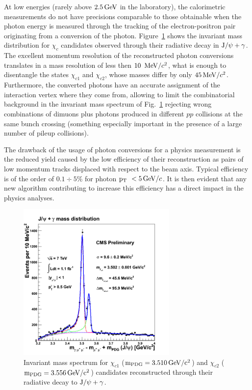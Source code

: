 \documentclass[a4paper]{jpconf}
\def \Chione {\chi_{c1}}
\def \Chitwo {\chi_{c2}}
\def \JPsi{\rm J/\psi}
\def \cPgg{\gamma}
\def \pt{$\p_{\rm T}$~}
\begin{document}
At  low energies (rarely above 
$2.5{\rm \, GeV}$ in the laboratory), the calorimetric
measurements do not have precisions comparable to those obtainable
when the photon energy is measured through the tracking of the 
electron-positron pair originating from a conversion of the photon.
Figure~\ref{fig:chic} shows the invariant mass distribution for $\chi_c$ candidates
observed through their radiative decay in $\JPsi + \cPgg$. The excellent momentum resolution of the reconstructed photon conversions translates in a mass resolution of less then $10~{\rm \, MeV}/c^2$, what is enough to disentangle  the states $\Chione$ and $\Chitwo$, whose masses differ by only $45{\rm \, MeV}/c^2$.
%
Furthermore, the  converted photons have an accurate assignment of the interaction vertex where they come from, allowing  to limit the combinatorial background in the invariant mass spectrum of Fig.~\ref{fig:chic}
rejecting wrong combinations of  dimuons  plus  photons produced in different $pp$ collisions at the same bunch crossing (something especially important in the
presence of a large number of pileup collisions). 


The drawback of the usage of photon conversions for a physics measurement 
is the reduced yield caused by the low efficiency of their reconstruction as pairs of low momentum tracks displaced with respect to the beam axis. Typical efficiency is of the order of $0.1 \div 5\%$ for photon \pt  $< 5 {\rm \, GeV}/c$. It is then evident that any new algorithm contributing to increase this efficiency has a direct impact in the physics analyses.





\begin{figure}[h]
  \begin{center}
    \includegraphics[width=0.7\textwidth]{fig/Chic1fb.png}
   \caption{    \label{fig:chic}
Invariant mass spectrum for $\chi_{c1}$ ($\rm m_{PDG} = 3.510{\rm \, GeV}/c^2$) and $\chi_{c2}$ ($\rm m_{PDG} = 3.556{\rm \, GeV}/c^2$)  candidates  reconstructed through their radiative decay to $\JPsi + \cPgg$.}
     \end{center}
\end{figure} 
\end{document}
